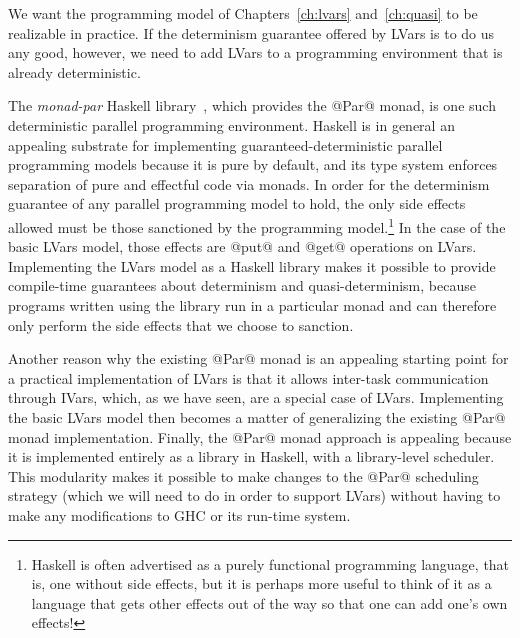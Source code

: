 We want the programming model of Chapters~\ref{ch:lvars}
and~\ref{ch:quasi} to be realizable in practice.  If the determinism
guarantee offered by LVars is to do us any good, however, we need to
add LVars to a programming environment that is already deterministic.

The \emph{monad-par} Haskell library~\cite{monad-par}, which provides
the @Par@ monad, is one such deterministic parallel programming
environment.  Haskell is in general an appealing substrate for
implementing guaranteed-deterministic parallel programming models
because it is pure by default, and its type system enforces separation
of pure and effectful code via monads.  In order for the determinism
guarantee of any parallel programming model to hold, the only side
effects allowed must be those sanctioned by the programming
model.\footnote{Haskell is often advertised as a purely functional
programming language, that is, one without side effects, but it is
perhaps more useful to think of it as a language that gets other
effects out of the way so that one can add one's own effects!}  In the
case of the basic LVars model, those effects are @put@ and @get@
operations on LVars. 
Implementing the LVars model as a Haskell library makes it possible to
provide compile-time guarantees about determinism and
quasi-determinism, because programs written using the library run in a
particular monad and can therefore only perform the side effects that
we choose to sanction.

Another reason why the existing @Par@ monad is an appealing starting
point for a practical implementation of LVars is that it allows
inter-task communication through IVars, which, as we have seen, are a
special case of LVars.  Implementing the basic LVars model then
becomes a matter of generalizing the existing @Par@ monad
implementation.  Finally, the @Par@ monad approach is appealing
because it is implemented entirely as a library in Haskell, with a
library-level scheduler.  This modularity makes it possible to make
changes to the @Par@ scheduling strategy (which we will need to do in
order to support LVars) without having to make any modifications to
GHC or its run-time system.

